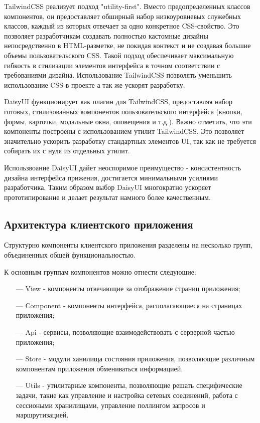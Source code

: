 TailwindCSS реализует подход "utility-first". Вместо предопределенных классов компонентов, он предоставляет обширный набор низкоуровневых служебных классов, каждый из которых отвечает за одно конкретное CSS-свойство. Это позволяет разработчикам создавать полностью кастомные дизайны непосредственно в HTML-разметке, не покидая контекст и не создавая большие объемы пользовательского CSS. Такой подход обеспечивает максимальную гибкость в стилизации элементов интерфейса в точном соответствии с требованиями дизайна. Использование TailwindCSS позволять уменьшить использование CSS в проекте а так же ускорят разработку.

DaisyUI функционирует как плагин для TailwindCSS, предоставляя набор готовых, стилизованных компонентов пользовательского интерфейса (кнопки, формы, карточки, модальные окна, оповещения и т.д.). Важно отметить, что эти компоненты построены с использованием утилит TailwindCSS. Это позволяет значительно ускорить разработку стандартных элементов UI, так как не требуется собирать их с нуля из отдельных утилит.

Использвоание DaisyUI дайет неоспоримое преимущество - консистентность дизайна интерфейса прижения, достигается минимальными усилиями разработчика. Таким образом выбор DaisyUI многократно ускоряет прототипирование и делает результат намного более качественным.

\subsection{Архитектура клиентского приложения}

Структурно компоненты клиентского приложения разделены на несколько групп, объединенных общей функциональностью.

К основным группам компонентов можно отнести следующие:

\begin{itemize}
  \item[---] View - компоненты отвечающие за отображение страниц приложения;
  \item[---] Component - компоненты интерфейса, располагающиеся на страницах приложения;
  \item[---] Api - сервисы, позволяющие взаимодействовать с серверной частью приложения;
  \item[---] Store - модули ханилища состояния приложения, позволяющие различным компонентам приложения обмениваться информацией.
  \item[---] Utils - утилитарные компоненты, позволяющие решать специфические задачи, такие как управление и настройка сетевых соединений, работа с сессиоными хранилищами, управление поллингом запросов и маршрутизацией. 
\end{itemize}

